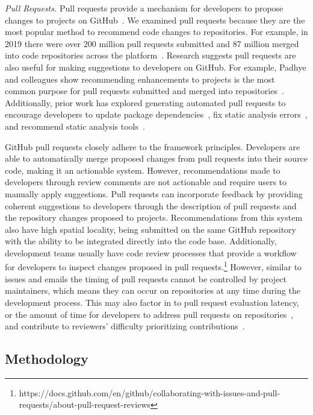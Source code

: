 \textit{Pull Requests.} Pull requests provide a mechanism for developers to propose changes to projects on GitHub~\cite{PullRequests}. We examined pull requests because they are the most popular method to recommend code changes to repositories. For example, in 2019 there were over 200 million pull requests submitted and 87 million merged into code repositories across the platform~\cite{Octoverse}. Research suggests pull requests are also useful for making suggestions to developers on GitHub. For example, Padhye and colleagues show recommending enhancements to projects is the most common purpose for pull requests submitted and merged into repositories~\cite{padhye2014contributions}. Additionally, prior work has explored generating automated pull requests to encourage developers to update package dependencies~\cite{Samim2017AutoPullRequests}, fix static analysis errors~\cite{C-3PR}, and recommend static analysis tools~\cite{Sorry}.

GitHub pull requests closely adhere to the \framework framework principles. Developers are able to automatically merge proposed changes from pull requests into their source code, making it an actionable system. However, recommendations made to developers through review comments are not actionable and require users to manually apply suggestions. Pull requests can incorporate feedback by providing coherent suggestions to developers through the description of pull requests and the repository changes proposed to projects. Recommendations from this system also have high spatial locality, being submitted on the same GitHub repository with the ability to be integrated directly into the code base. Additionally, development teams usually have code review processes that provide a workflow for developers to inspect changes proposed in pull requests.\footnote{https://docs.github.com/en/github/collaborating-with-issues-and-pull-requests/about-pull-request-reviews} However, similar to issues and emails the timing of pull requests cannot be controlled by project maintainers, which means they can occur on repositories at any time during the development process. This may also factor in to pull request evaluation latency, or the amount of time for developers to address pull requests on repositories~\cite{yu2015wait}, and contribute to reviewers' difficulty prioritizing contributions~\cite{gousios2015work}.



\subsection{Methodology}

